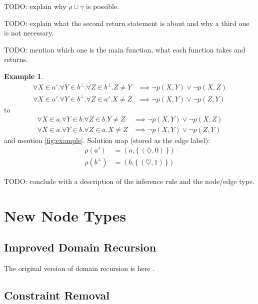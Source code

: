 \documentclass{article}
\theoremstyle{definition}
\newtheorem{example}{Example}
\begin{document}
TODO: explain why $\rho \cup \gamma$ is possible.

TODO: explain what the second return statement is about and why a third one is not necessary.

TODO: mention which one is the main function, what each function takes and returns.

\begin{example}
  \begin{align*}
    \forall X \in a'. \forall Y \in b^\bot. \forall Z \in b^\bot. Z \ne Y &\implies \neg p(X, Y) \lor \neg p(X, Z) \\
    \forall X \in a'. \forall Y \in b^\bot. \forall Z \in a'. X \ne Z &\implies \neg p(X, Y) \lor \neg p(Z, Y)
  \end{align*}
  to
  \begin{align*}
    \forall X \in a. \forall Y \in b. \forall Z \in b. Y \ne Z &\implies \neg p(X, Y) \lor \neg p(X, Z) \\
    \forall X \in a. \forall Y \in b. \forall Z \in a. X \ne Z &\implies \neg p(X, Y) \lor \neg p(Z, Y)
  \end{align*}
  and mention \cref{fig:example}. Solution map (stored as the edge label):
  \begin{align*}
    \rho(a') &= (a, \{\, (\diamondsuit, 0) \,\}) \\
    \rho(b^\bot) &= (b, \{\, (\heartsuit, 1) \,\})
  \end{align*}
\end{example}

TODO: conclude with a description of the inference rule and the node/edge type.

\section{New Node Types}

\subsection{Improved Domain Recursion}

The original version of domain recursion is here \cite{DBLP:conf/nips/Broeck11}.

\subsection{Constraint Removal}
\end{document}
